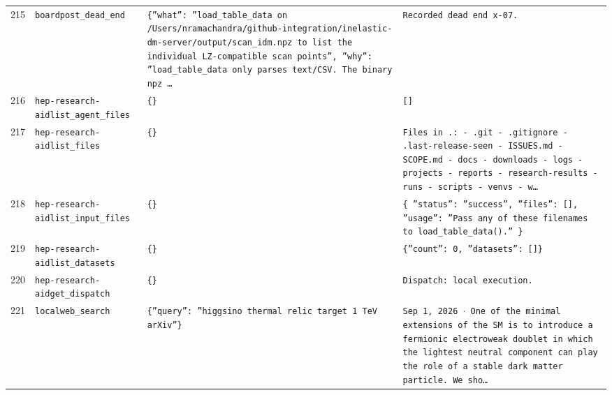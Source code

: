 \documentclass[11pt,a4paper]{article}
\begin{document}
\begin{longtable}{@{}p{}p{}p{}p{}@{}}
215 & \texttt{board}\newline\texttt{post\_\allowbreak{}dead\_\allowbreak{}end} & \texttt{\{''what'':\allowbreak{} ''load\_\allowbreak{}table\_\allowbreak{}data on /\allowbreak{}Users/\allowbreak{}nramachandra/\allowbreak{}github-integration/\allowbreak{}inelastic-dm-server/\allowbreak{}output/\allowbreak{}scan\_\allowbreak{}idm.npz to list the individual LZ-compatible scan points'',\allowbreak{} ''why'':\allowbreak{} ''load\_\allowbreak{}table\_\allowbreak{}data only parses text/\allowbreak{}CSV. The binary npz \ldots{}\allowbreak{}} & \texttt{Recorded dead end x-07.} \\
216 & \texttt{hep-research-aid}\newline\texttt{list\_\allowbreak{}agent\_\allowbreak{}files} & \texttt{\{\}\allowbreak{}} & \texttt{[]\allowbreak{}} \\
217 & \texttt{hep-research-aid}\newline\texttt{list\_\allowbreak{}files} & \texttt{\{\}\allowbreak{}} & \texttt{Files in .:\allowbreak{}   - .git   - .gitignore   - .last-release-seen   - ISSUES.md   - SCOPE.md   - docs   - downloads   - logs   - projects   - reports   - research-results   - runs   - scripts   - venvs   - w\ldots{}\allowbreak{}} \\
218 & \texttt{hep-research-aid}\newline\texttt{list\_\allowbreak{}input\_\allowbreak{}files} & \texttt{\{\}\allowbreak{}} & \texttt{\{   ''status'':\allowbreak{} ''success'',\allowbreak{}   ''files'':\allowbreak{} []\allowbreak{},\allowbreak{}   ''usage'':\allowbreak{} ''Pass any of these filenames to load\_\allowbreak{}table\_\allowbreak{}data()\allowbreak{}.'' \}\allowbreak{}} \\
219 & \texttt{hep-research-aid}\newline\texttt{list\_\allowbreak{}datasets} & \texttt{\{\}\allowbreak{}} & \texttt{\{''count'':\allowbreak{} 0,\allowbreak{} ''datasets'':\allowbreak{} []\allowbreak{}\}\allowbreak{}} \\
220 & \texttt{hep-research-aid}\newline\texttt{get\_\allowbreak{}dispatch} & \texttt{\{\}\allowbreak{}} & \texttt{Dispatch:\allowbreak{} local execution.} \\
221 & \texttt{local}\newline\texttt{web\_\allowbreak{}search} & \texttt{\{''query'':\allowbreak{} ''higgsino thermal relic target 1 TeV arXiv''\}\allowbreak{}} & \texttt{Sep 1,\allowbreak{} 2026 $\cdot$ One of the minimal extensions of the SM is to introduce a fermionic electroweak doublet in which the lightest neutral component can play the role of a stable dark matter particle. We sho\ldots{}\allowbreak{}} \\

\end{longtable}
\end{document}

